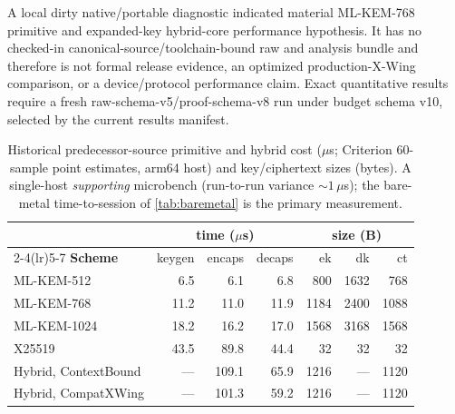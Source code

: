 \documentclass[journal]{IEEEtran}
\begin{document}
A local dirty native/portable diagnostic indicated material ML-KEM-768 primitive and
expanded-key hybrid-core performance hypothesis. It has no checked-in canonical-source/toolchain-bound raw
and analysis bundle and therefore is not formal release evidence, an optimized
production-X-Wing comparison, or a device/protocol performance claim. Exact
quantitative results require a fresh raw-schema-v5/proof-schema-v8 run under
budget schema v10, selected by the current results manifest.

\begin{table}[t]\centering\footnotesize
\setlength{\tabcolsep}{5pt}\renewcommand{\arraystretch}{1.15}
\caption{Historical predecessor-source primitive and hybrid cost ($\mu$s; Criterion 60-sample point estimates, arm64 host) and
key/ciphertext sizes (bytes). A single-host \emph{supporting} microbench (run-to-run variance
$\sim 1\,\mu$s); the bare-metal time-to-session of \cref{tab:baremetal} is the primary
measurement.}\label{tab:bench}
\begin{tabular}{@{}l r r r r r r@{}}
\toprule
 & \multicolumn{3}{c}{\textbf{time ($\mu$s)}} & \multicolumn{3}{c}{\textbf{size (B)}} \\
\cmidrule(lr){2-4}\cmidrule(lr){5-7}
\textbf{Scheme} & keygen & encaps & decaps & ek & dk & ct \\
\midrule
ML-KEM-512   & 6.5  & 6.1  & 6.8  & 800  & 1632 & 768  \\
ML-KEM-768   & 11.2 & 11.0 & 11.9 & 1184 & 2400 & 1088 \\
ML-KEM-1024  & 18.2 & 16.2 & 17.0 & 1568 & 3168 & 1568 \\
X25519       & 43.5 & 89.8 & 44.4 & 32   & 32   & 32   \\
\midrule
Hybrid, ContextBound & --- & 109.1 & 65.9 & 1216 & --- & 1120 \\
Hybrid, CompatXWing  & --- & 101.3 & 59.2 & 1216 & --- & 1120 \\
\bottomrule
\end{tabular}
\end{table}
\end{document}
